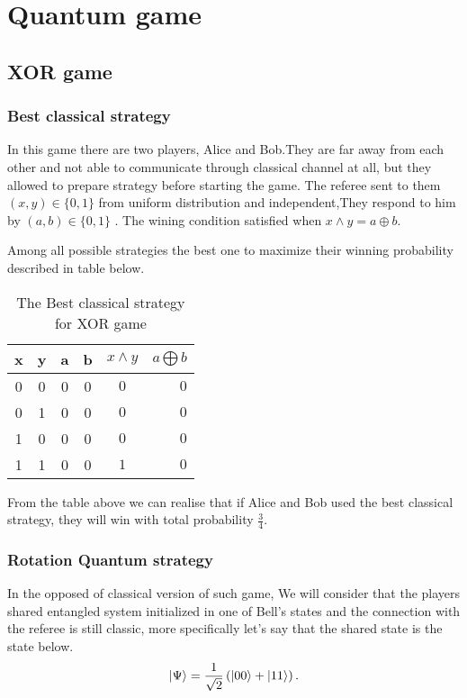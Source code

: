 \chapter{Quantum game}
\section{XOR game}
\subsection{Best classical strategy}
In this game there are  two players, Alice and Bob.They are far away from each other and not able to communicate through classical channel at all, but they allowed to prepare strategy  before starting the game. The referee sent to them    $(x,y)\in \{0,1\}$  from uniform distribution and independent\citep{PhysRevA.93.022333},They respond  to him by $(a,b)\in \{0,1\}$ .  The   wining  condition  satisfied when $x\wedge y= a\oplus b$.

 Among all possible strategies the best one to maximize their winning probability described in table below.

\begin {table}[htp]
\begin{center}
\begin{tabular}{ |c|c|c|c|c r| }
  \hline
  x & y & a & b &  $x \wedge y $ & $a\bigoplus b$\\
  \hline 
  0 & 0 & 0 & 0&$0$  & $0$\\
  \hline
  0 &1 & 0 & 0 &$0$  & $0$\\
  \hline
   1 & 0 & 0 & 0 &$0$ &  $0$\\
  \hline
  1 & 1 & 0 & 0 &$1$  & $0$\\
  \hline
\end{tabular}
\caption {The Best classical strategy for XOR game }
\end{center}
\end{table}
From the table above we can realise that if Alice and Bob used the best classical strategy, they will win with total probability $\frac{3}{4}$.
\subsection{Rotation Quantum strategy}

In the opposed of classical version of such game, We will consider that the players shared entangled system initialized in one of Bell's states and the connection with the referee is still classic, more specifically let's say that the shared state is the state below.
\begin{equation}
\ket{\Psi }= \frac{1}{\sqrt{2}}\left( \ket{00} +\ket{11} \right)\label{eq1} .
\end{equation}
	  
